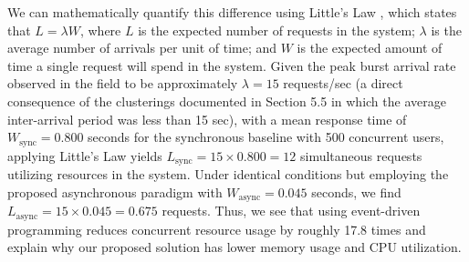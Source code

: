 We can mathematically quantify this difference using Little's Law \cite{little1961}, which states that $L = \lambda W$, where $L$ is the expected number of requests in the system; $\lambda$ is the average number of arrivals per unit of time; and $W$ is the expected amount of time a single request will spend in the system. Given the peak burst arrival rate observed in the field to be approximately $\lambda = 15$ requests/sec (a direct consequence of the clusterings documented in Section 5.5 in which the average inter-arrival period was less than 15 sec), with a mean response time of $W_{\text{sync}} = 0.800$ seconds for the synchronous baseline with 500 concurrent users, applying Little's Law yields $L_{\text{sync}} = 15 \times 0.800 = 12$ simultaneous requests utilizing resources in the system. Under identical conditions but employing the proposed asynchronous paradigm with $W_{\text{async}} = 0.045$ seconds, we find $L_{\text{async}} = 15 \times 0.045 = 0.675$ requests. Thus, we see that using event-driven programming reduces concurrent resource usage by roughly 17.8 times and explain why our proposed solution has lower memory usage and CPU utilization.
